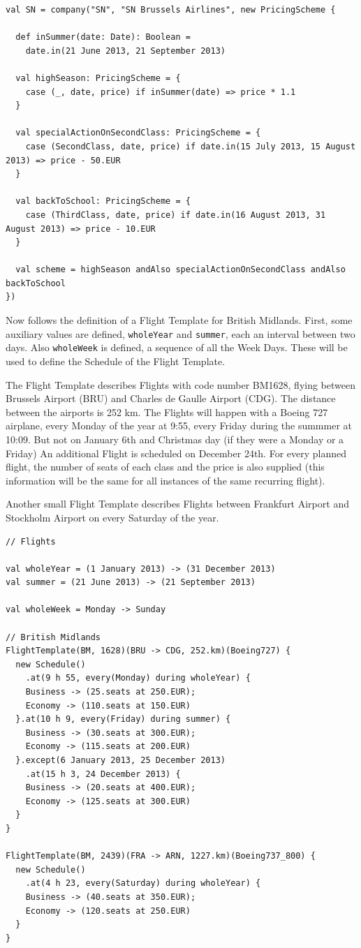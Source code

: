 \documentclass[a4paper]{article}
\renewcommand{\sc}[1]{\lstinline{#1}}
\begin{document}
\begin{lstlisting}
val SN = company("SN", "SN Brussels Airlines", new PricingScheme {

  def inSummer(date: Date): Boolean =
    date.in(21 June 2013, 21 September 2013)

  val highSeason: PricingScheme = {
    case (_, date, price) if inSummer(date) => price * 1.1
  }

  val specialActionOnSecondClass: PricingScheme = {
    case (SecondClass, date, price) if date.in(15 July 2013, 15 August 2013) => price - 50.EUR
  }

  val backToSchool: PricingScheme = {
    case (ThirdClass, date, price) if date.in(16 August 2013, 31 August 2013) => price - 10.EUR
  }

  val scheme = highSeason andAlso specialActionOnSecondClass andAlso backToSchool
})
\end{lstlisting}

Now follows the definition of a Flight Template for British Midlands.
First, some auxiliary values are defined, \sc{wholeYear} and \sc{summer}, each an interval between two days.
Also \sc{wholeWeek} is defined, a sequence of all the Week Days.
These will be used to define the Schedule of the Flight Template.

The Flight Template describes Flights with code number BM1628, flying between Brussels Airport (BRU) and Charles de Gaulle Airport (CDG).
The distance between the airports is 252 km.
The Flights will happen with a Boeing 727 airplane, every Monday of the year at 9:55, every Friday during the summmer at 10:09.
But not on January 6th and Christmas day (if they were a Monday or a Friday)
An additional Flight is scheduled on December 24th.
For every planned flight, the number of seats of each class and the price is also supplied (this information will be the same for all instances of the same recurring flight).

Another small Flight Template describes Flights between Frankfurt Airport and Stockholm Airport on every Saturday of the year.

\begin{lstlisting}
// Flights

val wholeYear = (1 January 2013) -> (31 December 2013)
val summer = (21 June 2013) -> (21 September 2013)

val wholeWeek = Monday -> Sunday

// British Midlands
FlightTemplate(BM, 1628)(BRU -> CDG, 252.km)(Boeing727) {
  new Schedule()
    .at(9 h 55, every(Monday) during wholeYear) {
    Business -> (25.seats at 250.EUR);
    Economy -> (110.seats at 150.EUR)
  }.at(10 h 9, every(Friday) during summer) {
    Business -> (30.seats at 300.EUR);
    Economy -> (115.seats at 200.EUR)
  }.except(6 January 2013, 25 December 2013)
    .at(15 h 3, 24 December 2013) {
    Business -> (20.seats at 400.EUR);
    Economy -> (125.seats at 300.EUR)
  }
}

FlightTemplate(BM, 2439)(FRA -> ARN, 1227.km)(Boeing737_800) {
  new Schedule()
    .at(4 h 23, every(Saturday) during wholeYear) {
    Business -> (40.seats at 350.EUR);
    Economy -> (120.seats at 250.EUR)
  }
}
\end{lstlisting}
\end{document}
